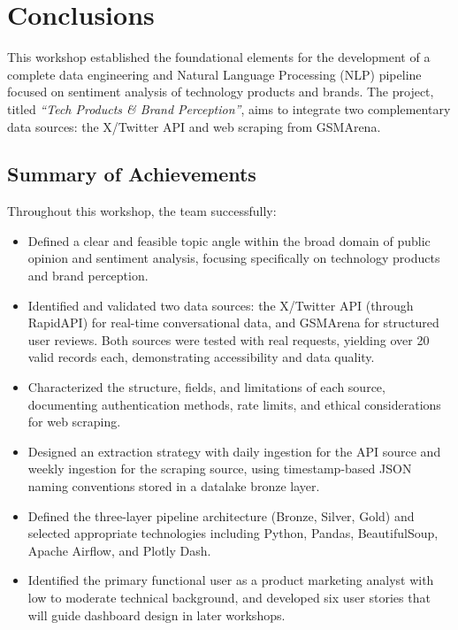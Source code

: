 \documentclass[12pt]{article}
\begin{document}
\section{Conclusions}

This workshop established the foundational elements for the development of a complete data engineering and Natural Language Processing (NLP) pipeline focused on sentiment analysis of technology products and brands. The project, titled \textit{“Tech Products \& Brand Perception”}, aims to integrate two complementary data sources: the X/Twitter API and web scraping from GSMArena.

\subsection{Summary of Achievements}
Throughout this workshop, the team successfully:
\begin{itemize}
    \item Defined a clear and feasible topic angle within the broad domain of public opinion and sentiment analysis, focusing specifically on technology products and brand perception.
    \item Identified and validated two data sources: the X/Twitter API (through RapidAPI) for real-time conversational data, and GSMArena for structured user reviews. Both sources were tested with real requests, yielding over 20 valid records each, demonstrating accessibility and data quality.
    \item Characterized the structure, fields, and limitations of each source, documenting authentication methods, rate limits, and ethical considerations for web scraping.
    \item Designed an extraction strategy with daily ingestion for the API source and weekly ingestion for the scraping source, using timestamp-based JSON naming conventions stored in a datalake bronze layer.
    \item Defined the three-layer pipeline architecture (Bronze, Silver, Gold) and selected appropriate technologies including Python, Pandas, BeautifulSoup, Apache Airflow, and Plotly Dash.
    \item Identified the primary functional user as a product marketing analyst with low to moderate technical background, and developed six user stories that will guide dashboard design in later workshops.
\end{itemize}
\end{document}
